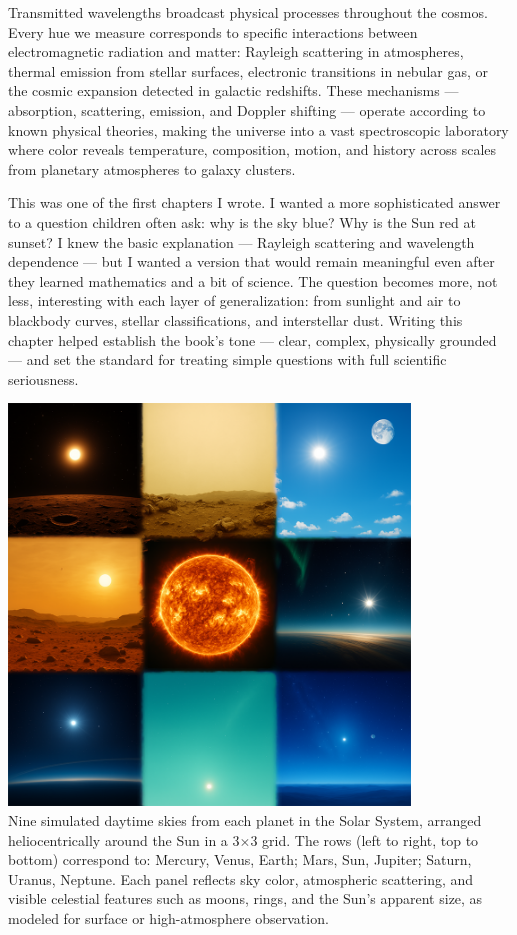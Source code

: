 Transmitted wavelengths broadcast physical processes throughout the cosmos. Every hue we measure corresponds to specific interactions between electromagnetic radiation and matter: Rayleigh scattering in atmospheres, thermal emission from stellar surfaces, electronic transitions in nebular gas, or the cosmic expansion detected in galactic redshifts. These mechanisms — absorption, scattering, emission, and Doppler shifting — operate according to known physical theories, making the universe into a vast spectroscopic laboratory where color reveals temperature, composition, motion, and history across scales from planetary atmospheres to galaxy clusters.

\newpage

\begin{commentary}
This was one of the first chapters I wrote. I wanted a more sophisticated answer to a question children often ask: why is the sky blue? Why is the Sun red at sunset? I knew the basic explanation — Rayleigh scattering and wavelength dependence — but I wanted a version that would remain meaningful even after they learned mathematics and a bit of science. The question becomes more, not less, interesting with each layer of generalization: from sunlight and air to blackbody curves, stellar classifications, and interstellar dust. Writing this chapter helped establish the book's tone — clear, complex, physically grounded — and set the standard for treating simple questions with full scientific seriousness.
\end{commentary}


\begin{center}
    \includegraphics[width=0.8\textwidth]{27_PlanetarySkyColors/SKIES1.png}\\
    {Nine simulated daytime skies from each planet in the Solar System, arranged heliocentrically around the Sun in a 3$\times$3 grid. The rows (left to right, top to bottom) correspond to: Mercury, Venus, Earth; Mars, Sun, Jupiter; Saturn, Uranus, Neptune. Each panel reflects sky color, atmospheric scattering, and visible celestial features such as moons, rings, and the Sun's apparent size, as modeled for surface or high-atmosphere observation.
    }   
\end{center}
